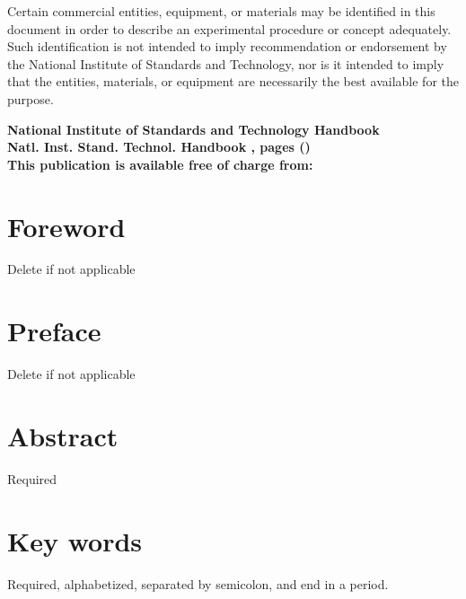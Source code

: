 \begin{titlepage}
\begin{flushright}
\footnotesize  Certain commercial entities, equipment, or materials may be identified in this document in order to describe an experimental procedure or concept adequately. Such identification is not intended to imply recommendation or endorsement by the National Institute of Standards and Technology, nor is it intended to imply that the entities, materials, or equipment are necessarily the best available for the purpose.\\ 
\vfill

\normalsize \textbf{National Institute of Standards and Technology Handbook \pubnumber\\ 
Natl. Inst. Stand. Technol. Handbook \pubnumber, \pageref{LastPage} pages (\monthyear)} \\
\vspace{12pt}
\textbf{This publication is available free of charge from: \DOI}
\vfill
\end{flushright}
\end{titlepage}


\section*{Foreword}
\normalsize Delete if not applicable\\
\section*{Preface}
\normalsize Delete if not applicable\\
\section*{Abstract}
\normalsize Required\\
\section*{Key words}
\normalsize Required, alphabetized, separated by semicolon, and end in a period.\\
\pagebreak